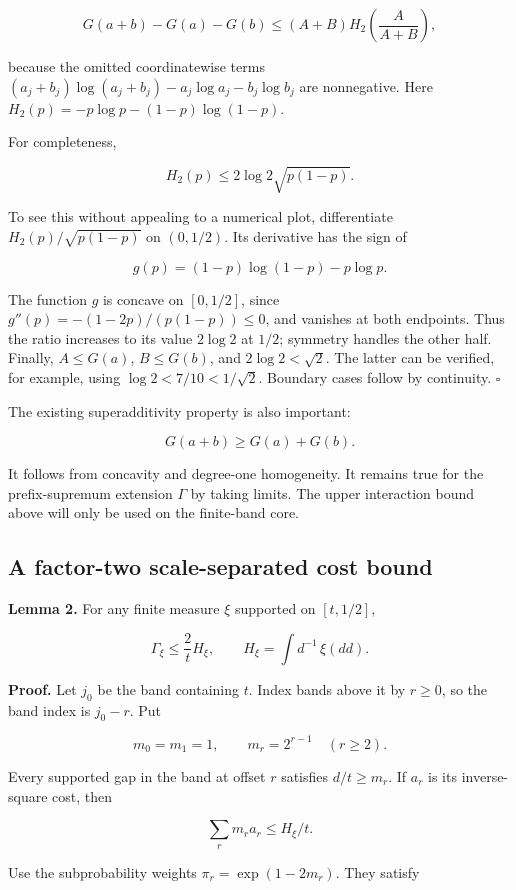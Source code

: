 \documentclass[
  11pt,
  a4paper,
]{article}
\begin{document}
\[
G(a+b)-G(a)-G(b)
\le (A+B)H_2\left(\frac{A}{A+B}\right),
\]

because the omitted coordinatewise terms
\((a_j+b_j)\log(a_j+b_j)-a_j\log a_j-b_j\log b_j\) are nonnegative. Here
\(H_2(p)=-p\log p-(1-p)\log(1-p)\).

For completeness,

\[
H_2(p)\le2\log2\sqrt{p(1-p)}.
\]

To see this without appealing to a numerical plot, differentiate
\(H_2(p)/\sqrt{p(1-p)}\) on \((0,1/2)\). Its derivative has the sign of

\[
g(p)=(1-p)\log(1-p)-p\log p.
\]

The function \(g\) is concave on \([0,1/2]\), since
\(g''(p)=-(1-2p)/(p(1-p))\le0\), and vanishes at both endpoints. Thus
the ratio increases to its value \(2\log2\) at \(1/2\); symmetry handles
the other half. Finally, \(A\le G(a)\), \(B\le G(b)\), and
\(2\log2<\sqrt2\). The latter can be verified, for example, using
\(\log2<7/10<1/\sqrt2\). Boundary cases follow by continuity.
\(\square\)

The existing superadditivity property is also important:

\[
G(a+b)\ge G(a)+G(b).
\]

It follows from concavity and degree-one homogeneity. It remains true
for the prefix-supremum extension \(\Gamma\) by taking limits. The upper
interaction bound above will only be used on the finite-band core.

\subsection{A factor-two scale-separated cost
bound}\label{a-factor-two-scale-separated-cost-bound}

\textbf{Lemma 2.} For any finite measure \(\xi\) supported on
\([t,1/2]\),

\[
\Gamma_\xi\le\frac{2}{t}H_\xi,
\qquad H_\xi=\int d^{-1}\,\xi(dd).
\]

\textbf{Proof.} Let \(j_0\) be the band containing \(t\). Index bands
above it by \(r\ge0\), so the band index is \(j_0-r\). Put

\[
m_0=m_1=1,\qquad m_r=2^{r-1}\quad(r\ge2).
\]

Every supported gap in the band at offset \(r\) satisfies
\(d/t\ge m_r\). If \(a_r\) is its inverse-square cost, then

\[
\sum_r m_ra_r\le H_\xi/t.
\]

Use the subprobability weights \(\pi_r=\exp(1-2m_r)\). They satisfy
\end{document}
